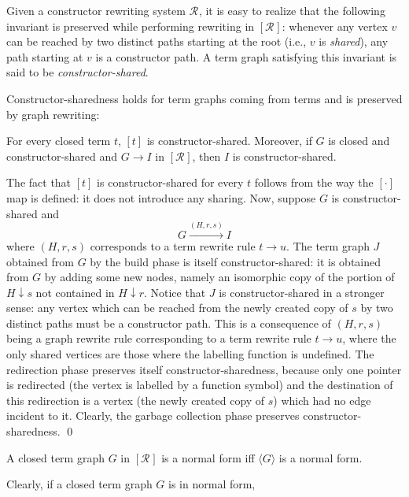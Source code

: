 \documentclass{LMCS}
\newcommand{\termone}{t}
\newcommand{\termtwo}{u}
\newcommand{\rootone}{r}
\newcommand{\roottwo}{s}
\newcommand{\verone}{v}
\newcommand{\tgone}{G}
\newcommand{\tgtwo}{H}
\newcommand{\tgthree}{J}
\newcommand{\tgfive}{I}
\newcommand{\rewrite}[1]{\stackrel{#1}{\longrightarrow}}
\newcommand{\Rules}[1]{\mathcal{R}_{#1}}
\newcommand{\CtoCG}[1]{[#1]}
\newcommand{\CGtoC}[1]{\langle #1\rangle}
\newcommand{\srrone}{\Rules{}}
\newcommand{\rewrTRS}{\rightarrow}
\newcommand{\rewrgraph}{\rightarrow}
\newcommand{\subgr}[2]{#1\downarrow #2}
\begin{document}
Given a constructor rewriting system $\srrone$, it is easy to realize that
the following invariant is preserved while performing
rewriting in $\CtoCG{\srrone}$: whenever any vertex $\verone$ can
be reached by two distinct paths starting at the root
(i.e., $\verone$ is \emph{shared}), any path starting at
$\verone$ is a constructor path. A term graph
satisfying this invariant is said to be 
\emph{constructor-shared}.

Constructor-sharedness holds for term graphs coming from terms and
is preserved by graph rewriting:
\begin{lem}\label{lemma:constructorsharedness}
For every closed term $\termone$, $\CtoCG{\termone}$ is constructor-shared.
Moreover, if $\tgone$ is closed and constructor-shared and $\tgone\rewrgraph\tgfive$ in $\CtoCG{\srrone}$, 
then $\tgfive$ is constructor-shared.
\end{lem}
\proof
The fact that $\CtoCG{\termone}$ is constructor-shared for every $\termone$ follows
from the way the $\CtoCG{\cdot}$ map is defined: it does not introduce any
sharing. Now, suppose $\tgone$ is constructor-shared and
$$
\tgone\rewrite{(\tgtwo,\rootone,\roottwo)}\tgfive
$$
where $(\tgtwo,\rootone,\roottwo)$ corresponds to a term rewrite
rule $\termone\rewrTRS\termtwo$. The term graph $\tgthree$ obtained from
$\tgone$ by the build phase is itself constructor-shared: it is obtained from
$\tgone$ by adding some new nodes, namely an isomorphic copy of the portion
of $\subgr{\tgtwo}{\roottwo}$ not contained in $\subgr{\tgtwo}{\rootone}$. Notice
that $\tgthree$ is constructor-shared in a stronger sense: any vertex which
can be reached from the newly created copy of $\roottwo$ by two distinct paths
must be a constructor path. This is a consequence of $(\tgtwo,\rootone,\roottwo)$ 
being a graph rewrite rule corresponding to a term rewrite
rule $\termone\rewrTRS\termtwo$, where the only shared vertices are those
where the labelling function is undefined. The redirection phase preserves
itself constructor-sharedness, because only one pointer is redirected
(the vertex is labelled by a function symbol) and the destination 
of this redirection is a vertex (the newly created
copy of $\roottwo$) which had no edge incident to it. Clearly, the
garbage collection phase preserves constructor-sharedness.
\qed
\begin{lem}\label{lemma:NFconstructorshared}
A closed term graph $\tgone$ in  $\CtoCG{\srrone}$ is a 
normal form iff $\CGtoC{\tgone}$ is a normal form.
\end{lem}
\proof
Clearly, if a closed term graph $\tgone$ is in normal form,
\end{document}
